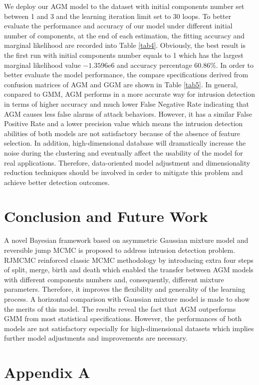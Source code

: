 \documentclass[conference]{IEEEtran}
\begin{document}
We deploy our AGM model to the dataset with initial components number set between 1 and 3 and the learning iteration limit set to 30 loops. To better evaluate the performance and accuracy of our model under different initial number of components, at the end of each estimation, the fitting accuracy and marginal likelihood\cite{Bouguila2009} are recorded into Table \ref{tab4}. Obviously, the best result is the first run with initial components number equals to 1 which has the largest marginal likelihood value $-1.3596\mathrm{e}{6}$ and accuracy percentage 60.86\%. In order to better evaluate the model performance, the compare specifications derived from confusion matrices of AGM and GGM are shown in Table \ref{tab5}. In general, conpared to GMM, AGM performs in a more accurate way for intrusion detection in terms of higher accuracy and much lower False Negative Rate indicating that AGM causes less false alarms of attack behaviors. However, it has a similar False Positive Rate and a lower precision value which means the intrusion detection abilities of both models are not satisfactory because of the absence of feature selection. In addition, high-dimensional database will dramatically increase the noise during the clustering and eventually affect the usability of the model for real applications. Therefore, data-oriented model adjustment and dimensionality reduction techniques should be involved in order to mitigate this problem and achieve better detection outcomes.

\section{Conclusion and Future Work}
A novel Bayesian framework based on asymmetric Gaussian mixture model and reversible jump MCMC is proposed to address intrusion detection problem. RJMCMC reinforced classic MCMC methodology by introducing extra four steps of split, merge, birth and death which enabled the transfer between AGM models with different components numbers and, consequently, different mixture parameters. Therefore, it improves the flexibility and generality of the learning process. A horizontal comparison with Gaussian mixture model is made to show the merits of this model. The results reveal the fact that AGM outperforms GMM from most statistical specifications. However, the performances of both models are not satisfactory especially for high-dimensional datasets which implies further model adjustments and improvements are necessary. 

\section*{Appendix A}
\end{document}
